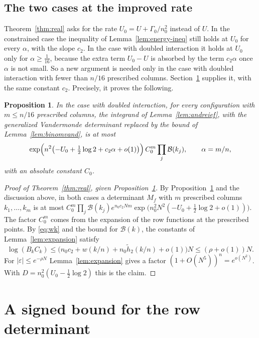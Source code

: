 \documentclass[11pt]{amsart}
\newtheorem{proposition}[theorem]{Proposition}
\theoremstyle{definition}
\theoremstyle{remark}
\numberwithin{equation}{section}
\begin{document}
\subsection{The two cases at the improved rate}\label{ssec:cases}
Theorem~\ref{thm:real} asks for the rate $U_0=U+\Gamma_0/n_0^2$ instead of $U$. In the constrained case the
inequality of Lemma~\ref{lem:energy-ineq} still holds at $U_0$ for every $\alpha$, with the slope $c_2$. In the
case with doubled interaction it holds at $U_0$ only for $\alpha\ge\frac1{16}$, because the extra term $U_0-U$
is absorbed by the term $c_2\alpha$ once $\alpha$ is not small. So a new argument is needed only in the case
with doubled interaction with fewer than $n/16$ prescribed columns. Section~\ref{sec:signed} supplies it,
with the same constant $c_2$. Precisely, it proves the following.

\begin{proposition}\label{prop:signed-goal}
In the case with doubled interaction, for every configuration with $m\le n/16$ prescribed columns, the
integrand of Lemma~\ref{lem:andreief}, with the generalized Vandermonde determinant replaced by the bound of
Lemma~\ref{lem:binomvand}, is at most
\[
 \exp\Bigl(n^2\bigl(-U_0+\tfrac12\log2+c_2\alpha+o(1)\bigr)\Bigr)\,C_0^m\prod_j\mathcal B(k_j),\qquad \alpha=m/n,
\]
with an absolute constant $C_0$.
\end{proposition}

\begin{proof}[Proof of Theorem~\ref{thm:real}, given Proposition~\ref{prop:signed-goal}]
By Proposition~\ref{prop:signed-goal} and the discussion above, in both cases a determinant $M_f$ with $m$
prescribed columns $k_1,\ldots,k_m$ is at most
$C_0^m\prod_j\mathcal B(k_j)e^{n_0c_2Nm}\exp\bigl(n_0^2N^2(-U_0+\frac12\log2+o(1))\bigr)$. The factor $C_0^m$ comes
from the expansion of the row functions at the prescribed points. By \eqref{eq:wk} and the bound for
$\mathcal B(k)$, the constants of Lemma~\ref{lem:expansion} satisfy
\[
 \log(B_kC_k)\le\bigl(n_0c_2+w(k/n)+n_0\tilde h_2(k/n)+o(1)\bigr)N\le(\rho+o(1))N .
\]
For $|\varepsilon|\le e^{-\rho N}$ Lemma~\ref{lem:expansion} gives a factor $(1+O(N^5))^n=e^{o(N^2)}$. With
$D=n_0^2(U_0-\frac12\log2)$ this is the claim.
\end{proof}
\section{A signed bound for the row determinant}\label{sec:signed}
\end{document}
